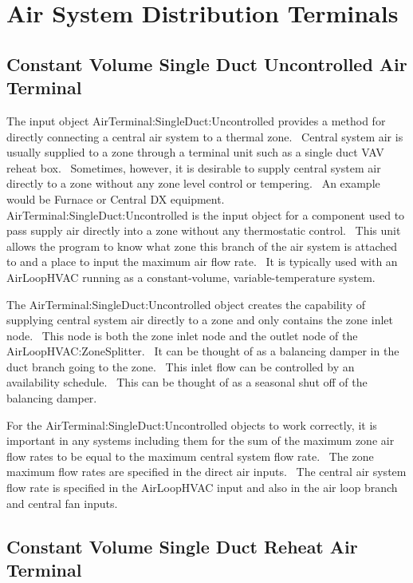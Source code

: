 \section{Air System Distribution Terminals }\label{air-system-distribution-terminals}

\subsection{Constant Volume Single Duct Uncontrolled Air Terminal}\label{constant-volume-single-duct-uncontrolled-air-terminal}

The input object AirTerminal:SingleDuct:Uncontrolled provides a method for directly connecting a central air system to a thermal zone.~ Central system air is usually supplied to a zone through a terminal unit such as a single duct VAV reheat box.~ Sometimes, however, it is desirable to supply central system air directly to a zone without any zone level control or tempering.~ An example would be Furnace or Central DX equipment.~ AirTerminal:SingleDuct:Uncontrolled is the input object for a component used to pass supply air directly into a zone without any thermostatic control.~ This unit allows the program to know what zone this branch of the air system is attached to and a place to input the maximum air flow rate.~ It is typically used with an AirLoopHVAC running as a constant-volume, variable-temperature system.

The AirTerminal:SingleDuct:Uncontrolled object creates the capability of supplying central system air directly to a zone and only contains the zone inlet node.~ This node is both the zone inlet node and the outlet node of the AirLoopHVAC:ZoneSplitter.~ It can be thought of as a balancing damper in the duct branch going to the zone.~ This inlet flow can be controlled by an availability schedule.~ This can be thought of as a seasonal shut off of the balancing damper.

For the AirTerminal:SingleDuct:Uncontrolled objects to work correctly, it is important in any systems including them for the sum of the maximum zone air flow rates to be equal to the maximum central system flow rate.~ The zone maximum flow rates are specified in the direct air inputs.~ The central air system flow rate is specified in the AirLoopHVAC input and also in the air loop branch and central fan inputs.

\subsection{Constant Volume Single Duct Reheat Air Terminal}\label{constant-volume-single-duct-reheat-air-terminal}

